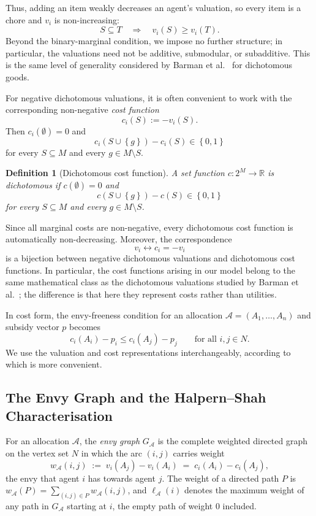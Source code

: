\documentclass[11pt]{article}
\theoremstyle{plain}
\newtheorem{definition}{Definition}
\theoremstyle{plain}
\newcommand{\agents}{N}                       %
\newcommand{\items}{M}                        %
\newcommand{\alloc}{\mathcal{A}}              %
\newcommand{\bundle}[1]{A_{#1}}
\newcommand{\subsidy}{p}                      %
\newcommand{\envygraph}[1]{G_{#1}}            %
\newcommand{\edgew}[1]{w_{#1}}                %
\newcommand{\pathw}[1]{\ell_{#1}}             %
\newcommand{\cost}{c}
\newcommand{\R}{\mathbb{R}}
\newcommand{\set}[1]{\left\{#1\right\}}
\begin{document}
Thus, adding an item weakly decreases an agent's valuation, so every item is a chore and $v_i$ is non-increasing:
\[
    S\subseteq T
    \quad\Longrightarrow\quad
    v_i(S)\ge v_i(T).
\]
Beyond the binary-marginal condition, we impose no further structure; in particular, the valuations need not be additive, submodular, or subadditive. This is the same level of generality considered by Barman et al.~\cite{BKNS22} for dichotomous goods.

For negative dichotomous valuations, it is often convenient to work with the corresponding non-negative \emph{cost function}
\[
    \cost_i(S):=-v_i(S).
\]
Then $\cost_i(\emptyset)=0$ and
\[
    \cost_i(S\cup\set{g})-\cost_i(S)\in\set{0,1}
\]
for every $S\subseteq\items$ and every $g\in\items\setminus S$.

\begin{definition}[Dichotomous cost function]
\label{def:dichcost}
A set function $\cost:2^{\items}\to\R$ is \emph{dichotomous} if $\cost(\emptyset)=0$ and
\[
    \cost(S\cup\set{g})-\cost(S)\in\set{0,1}
\]
for every $S\subseteq\items$ and every $g\in\items\setminus S$.
\end{definition}

Since all marginal costs are non-negative, every dichotomous cost function is automatically non-decreasing. Moreover, the correspondence
\[
    v_i \longleftrightarrow \cost_i=-v_i
\]
is a bijection between negative dichotomous valuations and dichotomous cost functions. In particular, the cost functions arising in our model belong to the same mathematical class as the dichotomous valuations studied by Barman et al.~\cite{BKNS22}; the difference is that here they represent costs rather than utilities.

In cost form, the envy-freeness condition for an allocation $\alloc=(\bundle1,\ldots,\bundle n)$ and subsidy vector $\subsidy$ becomes
\[
    \cost_i(\bundle i)-\subsidy_i
    \le
    \cost_i(\bundle j)-\subsidy_j
    \qquad\text{for all }i,j\in\agents.
\]
We use the valuation and cost representations interchangeably, according to which is more convenient.
\subsection{The Envy Graph and the Halpern--Shah Characterisation}
\label{sec:envygraph}



For an allocation $\alloc$, the \emph{envy graph} $\envygraph{\alloc}$ is the
complete weighted directed graph on the vertex set $\agents$ in which the arc
$(i,j)$ carries weight
\[
  \edgew{\alloc}(i,j) \;:=\; v_i(\bundle{j}) - v_i(\bundle{i})
  \;=\; \cost_i(\bundle{i}) - \cost_i(\bundle{j}),
\]
the envy that agent $i$ has towards agent $j$. The weight of a directed path $P$ is $\edgew{\alloc}(P) = \sum_{(i,j) \in P} \edgew{\alloc}(i,j)$, and $\pathw{\alloc}(i)$ denotes the maximum weight of any path in $\envygraph{\alloc}$ starting at $i$, the empty path of weight $0$ included.
\end{document}
